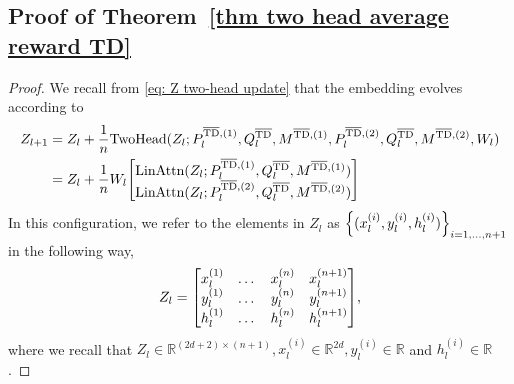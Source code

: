 \documentclass{article}
\newcommand{\R}{\mathbb{R}}
\newcommand{\attn}{\text{LinAttn}}
\newcommand{\twohead}{\text{TwoHead}}
\newcommand{\bartd}{\overline{\text{TD}}}
\begin{document}
\subsection{Proof of Theorem~\ref{thm two head average reward TD}}
\label{sec proof thm two head average reward TD}
\begin{proof}
    We recall from \eqref{eq: Z two-head update} that the embedding evolves according to 
    \begin{align}
        Z_{l+1} 
        &= Z_l + \frac{1}{n} \twohead(Z_l; P_l^{\bartd, (1)}, Q_l^{\bartd}, M^{\bartd, (1)}, P_l^{\bartd, (2)}, Q_l^{\bartd}, M^{\bartd, (2)}, W_l)\\
        &= Z_l + \frac{1}{n} W_l \mqty[\attn(Z_l; P_l^{\bartd, (1)}, Q_l^{\bartd}, M^{\bartd, (1)}) \\ 
                                       \attn(Z_l; P_l^{\bartd, (2)}, Q_l^{\bartd}, M^{\bartd, (2)})]
    \end{align}
     In this configuration, we refer to the elements in $Z_l$ as $\qty{(x^{(i)}_l, y^{(i)}_l, h^{(i)}_l)}_{i=1,\dots, n+1}$ in the following way,
    \begin{align}
        Z_l = \mqty[x_l^{(1)} & \dots & x_l^{(n)} & x_l^{(n+1)} \\ 
                    y_l^{(1)} & \dots & y_l^{(n)} & y_l^{(n+1)} \\
                    h_l^{(1)} & \dots & h_l^{(n)} & h_l^{(n+1)}],
    \end{align}
    where we recall that $Z_l \in \R^{(2d + 2) \times (n+1)}, x_l^{(i)} \in \R^{2d}, y^{(i)}_l \in \R$ and $h^{(i)}_l \in \R$.


\end{proof}
\end{document}

